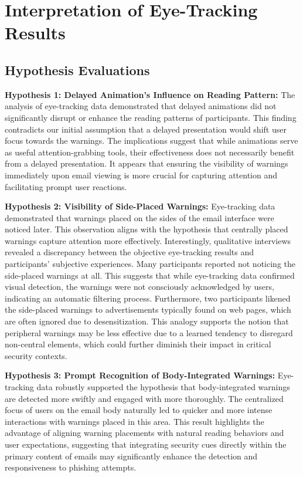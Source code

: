 \documentclass[
  a4paper,  %
  twoside,  %
  bibliography=totoc,
  headsepline,
  cleardoublepage=empty,
  parskip=half,
  draft=false
]{scrbook}
\begin{document}
\section{Interpretation of Eye-Tracking Results}
\subsection{Hypothesis Evaluations}
\textbf{Hypothesis 1: Delayed Animation's Influence on Reading Pattern:}
The analysis of eye-tracking data demonstrated that delayed animations did not significantly disrupt or enhance the reading patterns of participants. This finding contradicts our initial assumption that a delayed presentation would shift user focus towards the warnings. The implications suggest that while animations serve as useful attention-grabbing tools, their effectiveness does not necessarily benefit from a delayed presentation. It appears that ensuring the visibility of warnings immediately upon email viewing is more crucial for capturing attention and facilitating prompt user reactions. %

\textbf{Hypothesis 2: Visibility of Side-Placed Warnings:}
Eye-tracking data demonstrated that warnings placed on the sides of the email interface were noticed later. This observation aligns with the hypothesis that centrally placed warnings capture attention more effectively.\newline
Interestingly, qualitative interviews revealed a discrepancy between the objective eye-tracking results and participants' subjective experiences. Many participants reported not noticing the side-placed warnings at all. This suggests that while eye-tracking data confirmed visual detection, the warnings were not consciously acknowledged by users, indicating an automatic filtering process. \newline
Furthermore, two participants likened the side-placed warnings to advertisements typically found on web pages, which are often ignored due to desensitization. This analogy supports the notion that peripheral warnings may be less effective due to a learned tendency to disregard non-central elements, which could further diminish their impact in critical security contexts.

\textbf{Hypothesis 3: Prompt Recognition of Body-Integrated Warnings:}
Eye-tracking data robustly supported the hypothesis that body-integrated warnings are detected more swiftly and engaged with more thoroughly. The centralized focus of users on the email body naturally led to quicker and more intense interactions with warnings placed in this area. This result highlights the advantage of aligning warning placements with natural reading behaviors and user expectations, suggesting that integrating security cues directly within the primary content of emails may significantly enhance the detection and responsiveness to phishing attempts.
\end{document}
